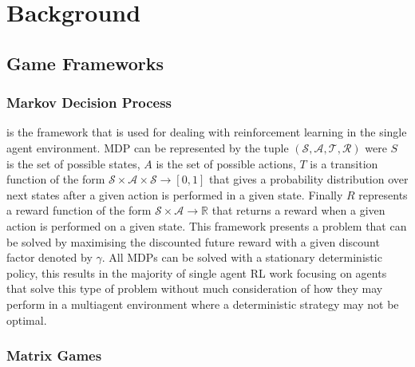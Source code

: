 \documentclass[conference]{IEEEtran}
\begin{document}
\section{Background}

\subsection{Game Frameworks}

\subsubsection{Markov Decision Process} is the framework that is used for dealing with reinforcement
learning in the single agent environment. MDP can be represented by the tuple 
$(\mathcal{S}, \mathcal{A}, \mathcal{T}, \mathcal{R})$ were $S$ is the set of possible
states, $A$ is the set of possible actions, $T$ is a transition function of the form 
$\mathcal{S}\times\mathcal{A}\times\mathcal{S}\rightarrow [0,1]$ that gives a probability
distribution over next states after a given action is performed in a given state. Finally
$R$ represents a reward function of the form $\mathcal{S}\times\mathcal{A}\rightarrow \mathbb{R}$
that returns a reward when a given action is performed on a given state. This framework presents a problem that can be solved by maximising the discounted
future reward with a given discount factor denoted by $\gamma$. All MDPs can be solved
with a stationary deterministic policy, this results in the majority of single agent
RL work focusing on agents that solve this type of problem without much consideration
of how they may perform in a multiagent environment where a deterministic strategy may
not be optimal.

\subsubsection{Matrix Games}
\end{document}

